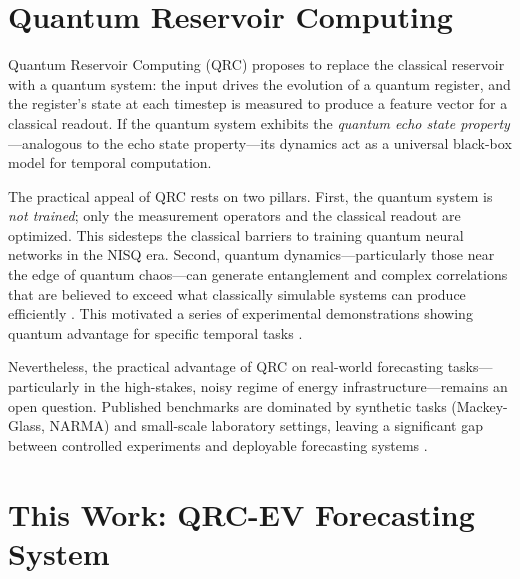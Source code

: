 
\section{Quantum Reservoir Computing}
\label{sec:intro:qrc}

Quantum Reservoir Computing (QRC) \citep{jaeger2004harnessing,
fujii2017keep, appert2023quantum} proposes to replace the classical
reservoir with a quantum system: the input drives the evolution of a
quantum register, and the register's state at each timestep is measured to
produce a feature vector for a classical readout. If the quantum system
exhibits the \emph{quantum echo state property}—analogous to the echo
state property—its dynamics act as a universal black-box model for
temporal computation.

The practical appeal of QRC rests on two pillars. First, the quantum
system is \emph{not trained}; only the measurement operators and the
classical readout are optimized. This sidesteps the classical
barriers to training quantum neural networks in the NISQ era. Second,
quantum dynamics—particularly those near the edge of quantum chaos—can
generate entanglement and complex correlations that are believed to exceed
what classically simulable systems can produce efficiently
\citep{arute2019quantum, boixo2018characterizing}. This motivated a
series of experimental demonstrations showing quantum advantage for
specific temporal tasks
\citep{ Dumitrescu2018, Chen2020, Zheng2021, Ollitrault2023}.

Nevertheless, the practical advantage of QRC on real-world forecasting
tasks—particularly in the high-stakes, noisy regime of energy
infrastructure—remains an open question. Published benchmarks are
dominated by synthetic tasks (Mackey-Glass, NARMA) and small-scale
laboratory settings, leaving a significant gap between controlled
experiments and deployable forecasting systems
\citep{gosavic2024quantum, gonzalez2024benchmark}.


\section{This Work: QRC-EV Forecasting System}
\label{sec:intro:this_work}

